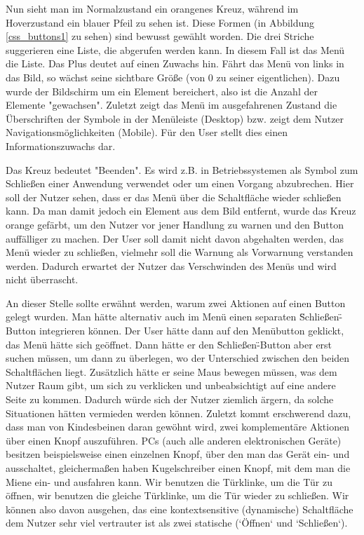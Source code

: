 Nun sieht man im Normalzustand ein orangenes Kreuz, während im Hoverzustand ein blauer Pfeil zu sehen ist. Diese Formen (in Abbildung \ref{css_buttons1} zu sehen) sind bewusst gewählt worden. Die drei Striche suggerieren eine Liste, die abgerufen werden kann. In diesem Fall ist das Menü die Liste. Das Plus deutet auf einen Zuwachs hin. Fährt das Menü von links in das Bild, so wächst seine sichtbare Größe (von 0 zu seiner eigentlichen). Dazu wurde der Bildschirm um ein Element bereichert, also ist die Anzahl der Elemente "gewachsen". Zuletzt zeigt das Menü im ausgefahrenen Zustand die Überschriften der Symbole in der Menüleiste (Desktop) bzw. zeigt dem Nutzer Navigationsmöglichkeiten (Mobile). Für den User stellt dies einen Informationszuwachs dar.

Das Kreuz bedeutet "Beenden". Es wird z.B. in Betriebssystemen als Symbol zum Schließen einer Anwendung verwendet oder um einen Vorgang abzubrechen. Hier soll der Nutzer sehen, dass er das Menü über die Schaltfläche wieder schließen kann. Da man damit jedoch ein Element aus dem Bild entfernt, wurde das Kreuz orange gefärbt, um den Nutzer vor jener Handlung zu warnen und den Button auffälliger zu machen. Der User soll damit nicht davon abgehalten werden, das Menü wieder zu schließen, vielmehr soll die Warnung als Vorwarnung verstanden werden. Dadurch erwartet der Nutzer das Verschwinden des Menüs und wird nicht überrascht.

An dieser Stelle sollte erwähnt werden, warum zwei Aktionen auf einen Button gelegt wurden. Man hätte alternativ auch im Menü einen separaten \"Schließen\"-Button integrieren können. Der User hätte dann auf den Menübutton geklickt, das Menü hätte sich geöffnet. Dann hätte er den \"Schließen\"-Button aber erst suchen müssen, um dann zu überlegen, wo der Unterschied zwischen den beiden Schaltflächen liegt. Zusätzlich hätte er seine Maus bewegen müssen, was dem Nutzer Raum gibt, um sich zu verklicken und unbeabsichtigt auf eine andere Seite zu kommen. Dadurch würde sich der Nutzer ziemlich ärgern, da solche Situationen hätten vermieden werden können. Zuletzt kommt erschwerend dazu, dass man von Kindesbeinen daran gewöhnt wird, zwei komplementäre Aktionen über einen Knopf auszuführen. PCs (auch alle anderen elektronischen Geräte) besitzen beispielsweise einen einzelnen Knopf, über den man das Gerät ein- und ausschaltet, gleichermaßen haben Kugelschreiber einen Knopf, mit dem man die Miene ein- und ausfahren kann. Wir benutzen die Türklinke, um die Tür zu öffnen, wir benutzen die gleiche Türklinke, um die Tür wieder zu schließen. Wir können also davon ausgehen, das  eine kontextsensitive (dynamische) Schaltfläche dem Nutzer sehr viel vertrauter ist als zwei statische (`Öffnen` und `Schließen`).

